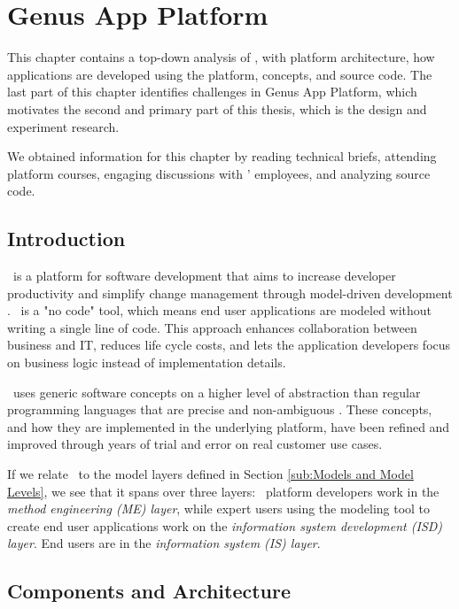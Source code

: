 \chapter{Genus App Platform}
\label{chap:gap}

This chapter contains a top-down analysis of \gap, with platform architecture, how applications are developed using the platform, concepts, and source code. The last part of this chapter identifies challenges in Genus App Platform, which motivates the second and primary part of this thesis, which is the design and experiment research.

We obtained information for this chapter by reading technical briefs, attending platform courses, engaging discussions with \genus' employees, and analyzing source code.


\clearpage
\section{Introduction}
\label{sec:Introduction}


\gap~is a platform for software development that aims to increase developer productivity and simplify change management through model-driven development \cite{Genus_AS2016-kt}. \gap~is a "no code" tool, which means end user applications are modeled without writing a single line of code. This approach enhances collaboration between business and IT, reduces life cycle costs, and lets the application developers focus on business logic instead of implementation details. 

\gap~uses generic software concepts on a higher level of abstraction than regular programming languages that are precise and non-ambiguous \cite{noauthor_undated-qy}. These concepts, and how they are implemented in the underlying platform, have been refined and improved through years of trial and error on real customer use cases.

If we relate \gap~to the model layers defined in Section \ref{sub:Models and Model Levels}, we see that it spans over three layers: \gap~platform developers work in the \textit{method engineering (ME) layer}, while expert users using the modeling tool to create end user applications work on the \textit{information system development (ISD) layer}. End users are in the \textit{information system (IS) layer}.

\section{Components and Architecture}
\label{sec:Components and Architecture}

